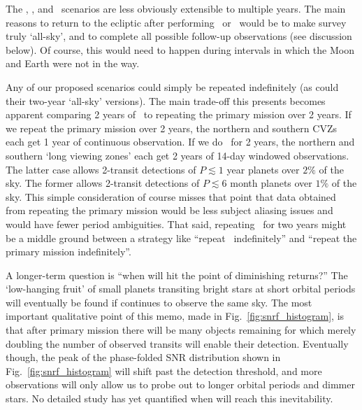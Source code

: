 The \elong, \eshort, and \hemis\ scenarios are less obviously extensible to multiple years.
The main reasons to return to the ecliptic after performing \elong\ or \eshort\ would be to make \tesss survey truly `all-sky', and to complete all possible \ktwo follow-up observations (see discussion below).
Of course, this would need to happen during intervals in which the Moon and Earth were not in the way.

Any of our proposed scenarios could simply be repeated indefinitely (as could their two-year `all-sky' versions).
The main trade-off this presents becomes apparent comparing 2 years of \hemis\ to repeating the primary mission over 2 years.
If we repeat the primary mission over 2 years, the northern and southern CVZs each get 1 year of continuous observation.
If we do \hemis\ for 2 years, the northern and southern `long viewing zones' each get 2 years of 14-day windowed observations.
The latter case allows 2-transit detections of $P\lesssim1$ year planets over $2\%$ of the sky.
The former allows 2-transit detections of $P\lesssim6$ month planets over $1\%$ of the sky.
This simple consideration of course misses that point that data obtained from repeating the primary mission would be less subject aliasing issues and would have fewer period ambiguities.
That said, repeating \hemis\ for two years might be a middle ground between a strategy like ``repeat \npole\ indefinitely'' and ``repeat the primary mission indefinitely''.


A longer-term question is ``when will \tess hit the point of diminishing returns?''
The `low-hanging fruit' of small planets transiting bright stars at short orbital periods will eventually be found if \tess continues to observe the same sky.
The most important qualitative point of this memo, made in Fig.~\ref{fig:snrf_histogram}, is that after \tesss primary mission there will be many objects remaining for which merely doubling the number of observed transits will enable their detection.
Eventually though, the peak of the phase-folded SNR distribution shown in Fig.~\ref{fig:snrf_histogram} will shift past the detection threshold, and more observations will only allow us to probe out to longer orbital periods and dimmer stars.
No detailed study has yet quantified when \tess will reach this inevitability.

